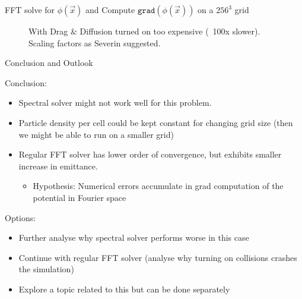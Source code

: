 \begin{frame}[t]{FFT solve for $\phi(\vec{x})$ and Compute $\texttt{grad}(\phi(\vec{x}))$ on a $256^3$ grid}
\begin{multicols}{2}
\begin{figure}[!htb]
      \caption{With Drag \& Diffusion turned on too expensive (~100x slower). Scaling factors as Severin suggested.}
      \label{fig:awesome_image6}
    \end{figure}
    \end{multicols}
\end{frame}


\begin{frame}{Conclusion and Outlook}
    \begin{large}
    Conclusion:
    \end{large}
    \begin{itemize}
        \item Spectral solver might not work well for this problem.
        \item Particle density per cell could be kept constant for changing grid size (then we might be able to run on a smaller grid)
        \item Regular FFT solver has lower order of convergence, but exhibits smaller increase in emittance.
        \begin{itemize}
            \item Hypothesis: Numerical errors accumulate in grad computation of the potential in Fourier space
        \end{itemize}
    \end{itemize}

    \begin{large}
    Options:
    \end{large}
    \begin{itemize}
        \item Further analyse why spectral solver performs worse in this case
        \item Continue with regular FFT solver (analyse why turning on collisions crashes the simulation)
        \item Explore a topic related to this but can be done separately
    \end{itemize}

\end{frame}




